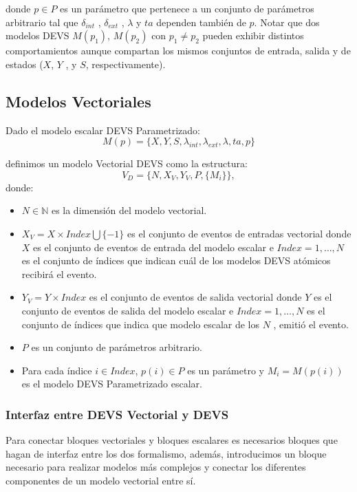 	donde $p \in P$ es un parámetro que pertenece a un conjunto de parámetros arbitrario tal que $\delta_{int}$ , $\delta_{ext}$ , $\lambda$ y $ta$ 
	dependen también de $p$.
	Notar que dos modelos DEVS $M (p_1 )$, $M (p_2 )$ con $p_1 \neq p_2$ pueden exhibir distintos comportamientos aunque compartan los mismos conjuntos 
	de entrada, salida y de estados ($X$, $Y$ , y $S$, respectivamente).

	\subsection{Modelos Vectoriales}
	Dado el modelo escalar DEVS Parametrizado:
	\begin{equation}
		M (p) = \{X, Y, S, \lambda_{int} , \lambda_{ext} , \lambda, ta, p\}
		\end{equation}

		definimos un modelo Vectorial DEVS\cite{BKC12} como la estructura:
		\begin{equation}
		V_D = \{N, X_V, Y_V, P, \{M_i\}\},
		\end{equation}
		donde:
		\begin{itemize}
		\item $N \in \mathbb{N}$ es la dimensión del modelo vectorial.

		\item $X_V = X \times Index \bigcup \{-1\}$ es el conjunto de eventos de entradas vectorial donde $X$ es el conjunto de eventos de entrada del modelo 
		escalar e $Index = {1, \ldots , N }$ es el conjunto de índices que indican cuál de los modelos DEVS atómicos recibirá el evento.

		\item $Y_V = Y \times Index$ es el conjunto de eventos de salida vectorial donde $Y$ es el conjunto de eventos de salida del modelo escalar e 
		$Index = {1, \ldots , N }$ es el conjunto de índices que indica que modelo escalar de los $N$ , emitió el evento. 

		\item $P$ es un conjunto de parámetros arbitrario.

		\item Para cada índice $i \in Index$, $p(i) \in P$ es un parámetro y $M_i = M (p(i))$ es el modelo DEVS Parametrizado escalar.
	\end{itemize}

	\subsubsection{Interfaz entre DEVS Vectorial y DEVS}
	Para conectar bloques vectoriales y bloques escalares es necesarios bloques que hagan de interfaz entre los dos formalismo, además, introducimos 
	un bloque necesario para realizar modelos más complejos y conectar los diferentes componentes de un modelo vectorial entre sí.

